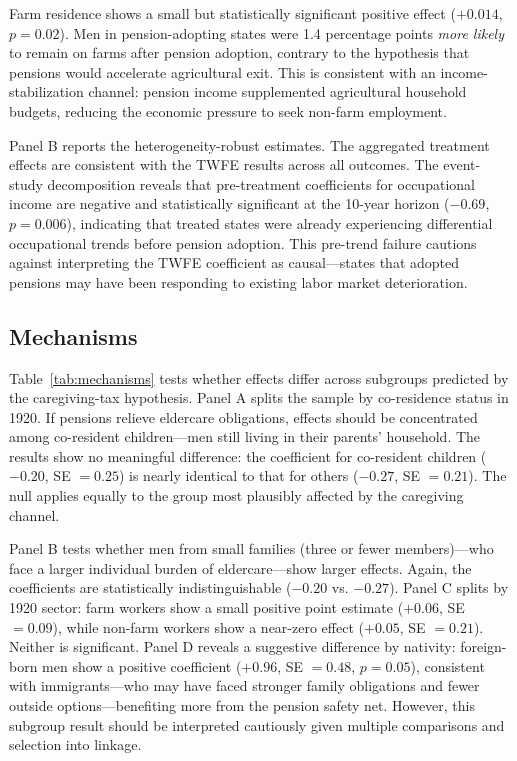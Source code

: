 \documentclass[12pt]{article}
\begin{document}
Farm residence shows a small but statistically significant positive effect ($+0.014$, $p = 0.02$). Men in pension-adopting states were 1.4 percentage points \textit{more likely} to remain on farms after pension adoption, contrary to the hypothesis that pensions would accelerate agricultural exit. This is consistent with an income-stabilization channel: pension income supplemented agricultural household budgets, reducing the economic pressure to seek non-farm employment.

Panel B reports the \citet{sunAbraham2021} heterogeneity-robust estimates. The aggregated treatment effects are consistent with the TWFE results across all outcomes. The event-study decomposition reveals that pre-treatment coefficients for occupational income are negative and statistically significant at the 10-year horizon ($-0.69$, $p = 0.006$), indicating that treated states were already experiencing differential occupational trends before pension adoption. This pre-trend failure cautions against interpreting the TWFE coefficient as causal---states that adopted pensions may have been responding to existing labor market deterioration.

\subsection{Mechanisms}



Table~\ref{tab:mechanisms} tests whether effects differ across subgroups predicted by the caregiving-tax hypothesis. Panel A splits the sample by co-residence status in 1920. If pensions relieve eldercare obligations, effects should be concentrated among co-resident children---men still living in their parents' household. The results show no meaningful difference: the coefficient for co-resident children ($-0.20$, SE $= 0.25$) is nearly identical to that for others ($-0.27$, SE $= 0.21$). The null applies equally to the group most plausibly affected by the caregiving channel.

Panel B tests whether men from small families (three or fewer members)---who face a larger individual burden of eldercare---show larger effects. Again, the coefficients are statistically indistinguishable ($-0.20$ vs. $-0.27$). Panel C splits by 1920 sector: farm workers show a small positive point estimate ($+0.06$, SE $= 0.09$), while non-farm workers show a near-zero effect ($+0.05$, SE $= 0.21$). Neither is significant. Panel D reveals a suggestive difference by nativity: foreign-born men show a positive coefficient ($+0.96$, SE $= 0.48$, $p = 0.05$), consistent with immigrants---who may have faced stronger family obligations and fewer outside options---benefiting more from the pension safety net. However, this subgroup result should be interpreted cautiously given multiple comparisons and selection into linkage.
\end{document}
